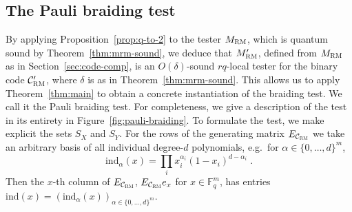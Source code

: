 \documentclass[11pt]{article}
\theoremstyle{definition}
\newcommand{\code}{\mathcal{C}}
\newcommand{\F}{\ensuremath{\mathbb{F}}}
\newcommand{\RM}{\ensuremath{\textsc{RM}}}
\newcommand{\ind}{\ensuremath{\mathrm{ind}}}
\begin{document}
\subsection{The Pauli braiding test}
By applying Proposition~\ref{prop:q-to-2} to the tester $M_\RM$, which is quantum sound by Theorem~\ref{thm:mrm-sound}, we deduce that $M'_\RM$, defined from $M_\RM$ as in Section~\ref{sec:code-comp}, is an $O(\delta)$-sound $rq$-local tester for the binary code $\code'_{\RM}$, where $\delta$ is as in Theorem~\ref{thm:mrm-sound}. This allows us to apply Theorem~\ref{thm:main} to obtain a concrete instantiation of the braiding test. We call it the Pauli braiding test. For completeness, we give a description of the test in its entirety in Figure~\ref{fig:pauli-braiding}. To formulate the test, we make explicit the sets $S_X$ and $S_Y$. For the rows of the generating matrix $E_{\code_\RM}$ we take an arbitrary basis of all individual degree-$d$ polynomials, e.g.\ for $\alpha \in \{0,\ldots,d\}^m$, 
\[ \ind_{\alpha}(x) = \prod_{i} x_i^{\alpha_i} (1-x_i)^{d-\alpha_i}\;.\]
Then the $x$-th column of $E_{\code_\RM}$, $E_{\code_{\RM}}e_x$ for $x\in \F_q^m$, has entries $\ind(x)=(\ind_{\alpha}(x))_{\alpha\in\{0,\ldots,d\}^m}$.
\end{document}
